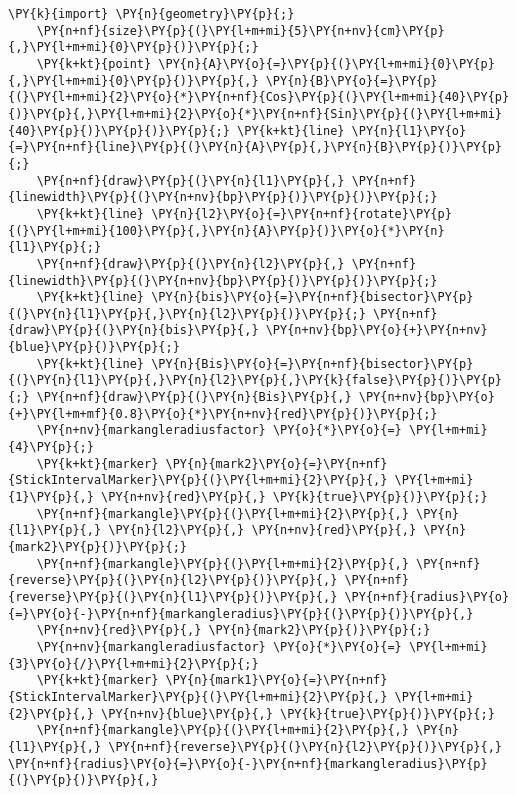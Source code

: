 \begin{Verbatim}[commandchars=\\\{\}]
    \PY{k}{import} \PY{n}{geometry}\PY{p}{;}
    \PY{n+nf}{size}\PY{p}{(}\PY{l+m+mi}{5}\PY{n+nv}{cm}\PY{p}{,}\PY{l+m+mi}{0}\PY{p}{)}\PY{p}{;}
    \PY{k+kt}{point} \PY{n}{A}\PY{o}{=}\PY{p}{(}\PY{l+m+mi}{0}\PY{p}{,}\PY{l+m+mi}{0}\PY{p}{)}\PY{p}{,} \PY{n}{B}\PY{o}{=}\PY{p}{(}\PY{l+m+mi}{2}\PY{o}{*}\PY{n+nf}{Cos}\PY{p}{(}\PY{l+m+mi}{40}\PY{p}{)}\PY{p}{,}\PY{l+m+mi}{2}\PY{o}{*}\PY{n+nf}{Sin}\PY{p}{(}\PY{l+m+mi}{40}\PY{p}{)}\PY{p}{)}\PY{p}{;} \PY{k+kt}{line} \PY{n}{l1}\PY{o}{=}\PY{n+nf}{line}\PY{p}{(}\PY{n}{A}\PY{p}{,}\PY{n}{B}\PY{p}{)}\PY{p}{;}
    \PY{n+nf}{draw}\PY{p}{(}\PY{n}{l1}\PY{p}{,} \PY{n+nf}{linewidth}\PY{p}{(}\PY{n+nv}{bp}\PY{p}{)}\PY{p}{)}\PY{p}{;}
    \PY{k+kt}{line} \PY{n}{l2}\PY{o}{=}\PY{n+nf}{rotate}\PY{p}{(}\PY{l+m+mi}{100}\PY{p}{,}\PY{n}{A}\PY{p}{)}\PY{o}{*}\PY{n}{l1}\PY{p}{;}
    \PY{n+nf}{draw}\PY{p}{(}\PY{n}{l2}\PY{p}{,} \PY{n+nf}{linewidth}\PY{p}{(}\PY{n+nv}{bp}\PY{p}{)}\PY{p}{)}\PY{p}{;}
    \PY{k+kt}{line} \PY{n}{bis}\PY{o}{=}\PY{n+nf}{bisector}\PY{p}{(}\PY{n}{l1}\PY{p}{,}\PY{n}{l2}\PY{p}{)}\PY{p}{;} \PY{n+nf}{draw}\PY{p}{(}\PY{n}{bis}\PY{p}{,} \PY{n+nv}{bp}\PY{o}{+}\PY{n+nv}{blue}\PY{p}{)}\PY{p}{;}
    \PY{k+kt}{line} \PY{n}{Bis}\PY{o}{=}\PY{n+nf}{bisector}\PY{p}{(}\PY{n}{l1}\PY{p}{,}\PY{n}{l2}\PY{p}{,}\PY{k}{false}\PY{p}{)}\PY{p}{;} \PY{n+nf}{draw}\PY{p}{(}\PY{n}{Bis}\PY{p}{,} \PY{n+nv}{bp}\PY{o}{+}\PY{l+m+mf}{0.8}\PY{o}{*}\PY{n+nv}{red}\PY{p}{)}\PY{p}{;}
    \PY{n+nv}{markangleradiusfactor} \PY{o}{*}\PY{o}{=} \PY{l+m+mi}{4}\PY{p}{;}
    \PY{k+kt}{marker} \PY{n}{mark2}\PY{o}{=}\PY{n+nf}{StickIntervalMarker}\PY{p}{(}\PY{l+m+mi}{2}\PY{p}{,} \PY{l+m+mi}{1}\PY{p}{,} \PY{n+nv}{red}\PY{p}{,} \PY{k}{true}\PY{p}{)}\PY{p}{;}
    \PY{n+nf}{markangle}\PY{p}{(}\PY{l+m+mi}{2}\PY{p}{,} \PY{n}{l1}\PY{p}{,} \PY{n}{l2}\PY{p}{,} \PY{n+nv}{red}\PY{p}{,} \PY{n}{mark2}\PY{p}{)}\PY{p}{;}
    \PY{n+nf}{markangle}\PY{p}{(}\PY{l+m+mi}{2}\PY{p}{,} \PY{n+nf}{reverse}\PY{p}{(}\PY{n}{l2}\PY{p}{)}\PY{p}{,} \PY{n+nf}{reverse}\PY{p}{(}\PY{n}{l1}\PY{p}{)}\PY{p}{,} \PY{n+nf}{radius}\PY{o}{=}\PY{o}{-}\PY{n+nf}{markangleradius}\PY{p}{(}\PY{p}{)}\PY{p}{,}
    \PY{n+nv}{red}\PY{p}{,} \PY{n}{mark2}\PY{p}{)}\PY{p}{;}
    \PY{n+nv}{markangleradiusfactor} \PY{o}{*}\PY{o}{=} \PY{l+m+mi}{3}\PY{o}{/}\PY{l+m+mi}{2}\PY{p}{;}
    \PY{k+kt}{marker} \PY{n}{mark1}\PY{o}{=}\PY{n+nf}{StickIntervalMarker}\PY{p}{(}\PY{l+m+mi}{2}\PY{p}{,} \PY{l+m+mi}{2}\PY{p}{,} \PY{n+nv}{blue}\PY{p}{,} \PY{k}{true}\PY{p}{)}\PY{p}{;}
    \PY{n+nf}{markangle}\PY{p}{(}\PY{l+m+mi}{2}\PY{p}{,} \PY{n}{l1}\PY{p}{,} \PY{n+nf}{reverse}\PY{p}{(}\PY{n}{l2}\PY{p}{)}\PY{p}{,} \PY{n+nf}{radius}\PY{o}{=}\PY{o}{-}\PY{n+nf}{markangleradius}\PY{p}{(}\PY{p}{)}\PY{p}{,}

\end{Verbatim}
